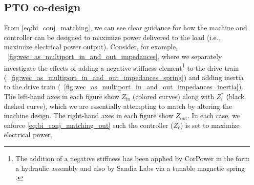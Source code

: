 \documentclass[lettersize,journal]{IEEEtran}
\begin{document}
\subsection{PTO co-design}\label{sec:pto_codesign}
From \eqref{eq:bi_conj_matching}, we can see clear guidance for how the machine and controller can be designed to maximize power delivered to the load (i.e., maximize electrical power output).
Consider, for example, \figurename~\ref{fig:wec_as_multiport_in_and_out_impedances}, where we separately investigate the effects of adding a negative stiffness element\footnote{The addition of a negative stiffness has been applied by CorPower in the form a hydraulic assembly \cite{Todalshaug:2016aa} and also by Sandia Labs via a tunable magnetic spring \cite{Forbush:2024aa}.} to the drive train (\figurename~\ref{fig:wec_as_multiport_in_and_out_impedances_spring}) and adding inertia to the drive train (\figurename~\ref{fig:wec_as_multiport_in_and_out_impedances_inertia}).
The left-hand axes in each figure show $Z_{\textrm{in}}$ (colored curves) along with $Z_i^*$ (black dashed curve), which we are essentially attempting to match by altering the machine design.
The right-hand axes in each figure show $Z_{\textrm{out}}$.
In each case, we enforce \eqref{eq:bi_conj_matching_out} such the controller ($Z_\ell$) is set to maximize electrical power.
\end{document}
